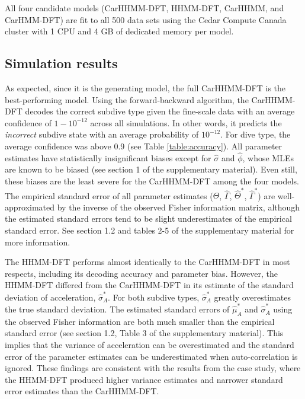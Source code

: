 All four candidate models (CarHHMM-DFT, HHMM-DFT, CarHHMM, and CarHMM-DFT) are fit to all 500 data sets using the Cedar Compute Canada cluster with 1 CPU and 4 GB of dedicated memory per model.

\subsection{Simulation results}

As expected, since it is the generating model, the full CarHHMM-DFT is the best-performing model. Using the forward-backward algorithm, the CarHHMM-DFT decodes the correct subdive type given the fine-scale data with an average confidence of $1 - 10^{-12}$ across all simulations. In other words, it predicts the \textit{incorrect} subdive state with an average probability of $10^{-12}$. For dive type, the average confidence was above 0.9 (see Table \ref{table:accuracy}). All parameter estimates have statistically insignificant biases except for $\hat \sigma$ and $\hat \phi$, whose MLEs are known to be biased (see section 1 of the supplementary material). Even still, these biases are the least severe for the CarHHMM-DFT among the four models. The empirical standard error of all parameter estimates ($\hat \Theta$, $\hat \Gamma$, $\hat \Theta^*$, $\hat \Gamma^*$) are well-approximated by the inverse of the observed Fisher information matrix, although the estimated standard errors tend to be slight underestimates of the empirical standard error. See section 1.2 and tables 2-5 of the supplementary material for more information.

The HHMM-DFT performs almost identically to the CarHHMM-DFT in most respects, including its decoding accuracy and parameter bias. However, the HHMM-DFT differed from the CarHHMM-DFT in its estimate of the standard deviation of acceleration, $\hat \sigma_A^*$. For both subdive types, $\hat \sigma_A^*$ greatly overestimates the true standard deviation. The estimated standard errors of $\hat \mu_A^*$ and $\hat \sigma_A^*$ using the observed Fisher information are both much smaller than the empirical standard error (see section 1.2, Table 3 of the supplementary material). This implies that the variance of acceleration can be overestimated and the standard error of the parameter estimates can be underestimated when auto-correlation is ignored. These findings are consistent with the results from the case study, where the HHMM-DFT produced higher variance estimates and narrower standard error estimates than the CarHHMM-DFT.

